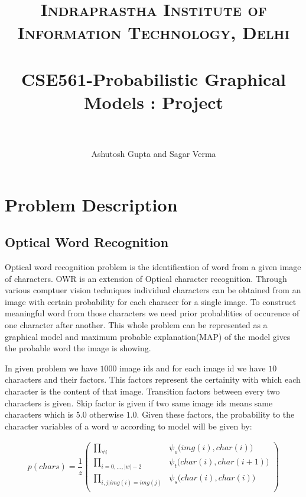 \documentclass[paper=a4, fontsize=11pt]{scrartcl} %
\title{	
\normalfont \normalsize 
\textsc{Indraprastha Institute of Information Technology, Delhi} \\ [25pt] %
\horrule{0.5pt} \\[0.4cm] %
\huge CSE561-Probabilistic Graphical Models : Project\\ %
\horrule{2pt} \\[0.5cm] %
}
\author{Ashutosh Gupta and Sagar Verma} %
\date{\normalsize\displaydate{date}} %
\numberwithin{equation}{section} %
\numberwithin{figure}{section} %
\numberwithin{table}{section} %
\begin{document}
\maketitle %


\section{Problem Description}

\subsection{Optical Word Recognition}

\par
Optical word recognition problem is the identification of word from a given image of characters. OWR is an extension of Optical character recognition. Through various comptuer vision techniques individual characters can be obtained from an image with certain probability for each characer for a single image. To construct meaningful word from those characters we need prior probablities of occurence of one character after another. This whole problem can be represented as a graphical model and maximum probable explanation(MAP) of the model gives the probable word the image is showing. 

\par
In given problem we have $1000$ image ids and for each image id we have $10$ characters and their factors. This factors represent the certainity with which each character is the content of that image. Transition factors between every two characters is given. Skip factor is given if two same image ids means same characters which is $5.0$ otherwise $1.0$. Given these factors, the probability to the character variables of a word $w$ according to model will be given by:


\begin{align*}
			p(chars) = \dfrac{1}{z} \begin{pmatrix}
										 \displaystyle \prod_{\forall i}^{} & \psi_{o}\big(img(i),char(i)\big) \\
										 \displaystyle \prod_{i=0,...,|w|-2}^{} & \psi_{t}\big(char(i),char(i+1)\big) \\
										 \displaystyle \prod_{i,j|img(i)=img(j)}^{} & \psi_{s}\big(char(i),char(i)\big) \\
									\end{pmatrix}
\end{align*}
\end{document}
